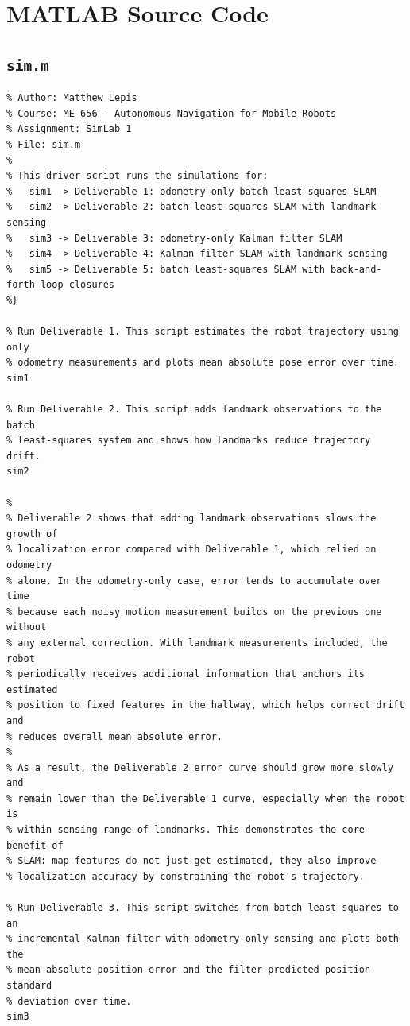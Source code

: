 \documentclass[11pt]{article}
\begin{document}
\appendix
\section{MATLAB Source Code}

\subsection*{\texttt{sim.m}}
\begin{lstlisting}[caption={sim.m}, label={lst:simm}]
%{
% Author: Matthew Lepis
% Course: ME 656 - Autonomous Navigation for Mobile Robots
% Assignment: SimLab 1
% File: sim.m
%
% This driver script runs the simulations for:
%   sim1 -> Deliverable 1: odometry-only batch least-squares SLAM
%   sim2 -> Deliverable 2: batch least-squares SLAM with landmark sensing
%   sim3 -> Deliverable 3: odometry-only Kalman filter SLAM
%   sim4 -> Deliverable 4: Kalman filter SLAM with landmark sensing
%   sim5 -> Deliverable 5: batch least-squares SLAM with back-and-forth loop closures
%}

% Run Deliverable 1. This script estimates the robot trajectory using only
% odometry measurements and plots mean absolute pose error over time.
sim1

% Run Deliverable 2. This script adds landmark observations to the batch
% least-squares system and shows how landmarks reduce trajectory drift.
sim2

%
% Deliverable 2 shows that adding landmark observations slows the growth of
% localization error compared with Deliverable 1, which relied on odometry
% alone. In the odometry-only case, error tends to accumulate over time
% because each noisy motion measurement builds on the previous one without
% any external correction. With landmark measurements included, the robot
% periodically receives additional information that anchors its estimated
% position to fixed features in the hallway, which helps correct drift and
% reduces overall mean absolute error.
%
% As a result, the Deliverable 2 error curve should grow more slowly and
% remain lower than the Deliverable 1 curve, especially when the robot is
% within sensing range of landmarks. This demonstrates the core benefit of
% SLAM: map features do not just get estimated, they also improve
% localization accuracy by constraining the robot's trajectory.

% Run Deliverable 3. This script switches from batch least-squares to an
% incremental Kalman filter with odometry-only sensing and plots both the
% mean absolute position error and the filter-predicted position standard
% deviation over time.
sim3


\end{lstlisting}
\end{document}
